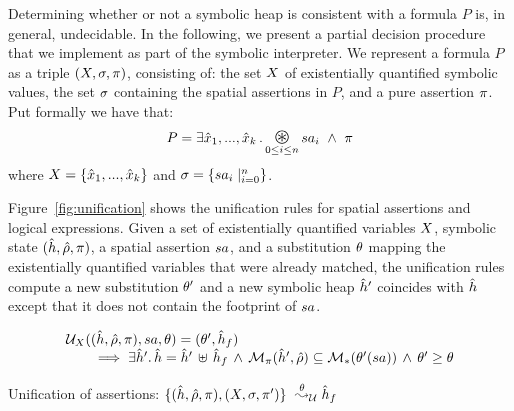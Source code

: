 Determining whether or not a symbolic heap is consistent with a formula $P$ is, in general, 
undecidable. In the following, we present a partial decision procedure that we  
implement as part of the \jsil symbolic interpreter. 
We represent a formula $P$ as a triple 
$(X, \sigma, \pi)$, consisting of: 
 the set $X$ of existentially quantified symbolic values, 
 the set $\sigma$ containing the spatial assertions in $P$, and 
 a pure assertion $\pi$. 
Put formally we have that: 
\begin{equation}
P = \exists \svar_1, ..., \svar_k \, . \bigoast_{0 \leq i \leq n} \sass_i \ \wedge \ \pfs
\end{equation}
where $X = \{ \hat{x}_1, ..., \hat{x}_k \}$ and $\sigma = \{ sa_i \mid_{i = 0}^n \}$. 

Figure~\ref{fig:unification} shows the unification rules for spatial assertions and logical 
expressions. Given a set of existentially quantified variables $X$, 
symbolic state $(\hat{h}, \hat\rho, \pi)$, a spatial assertion $sa$, and a substitution 
$\theta$ mapping the existentially quantified variables that were already matched, 
the unification rules compute a new substitution $\theta'$ and a new symbolic 
heap $\hat{h}'$ coincides with $\hat{h}$ except that it does not contain the footprint 
of $sa$. 

\begin{lemma}
$$
\begin{array}{l}
{\cal U}_{X}((\hat{h}, \hat\rho, \pi), sa, \theta) = (\theta', \hat{h}_f) \\
	\qquad \implies 
		\exists \hat{h}' . \, \hat{h} = \hat{h}' \, \uplus \, \hat{h}_f  \, \wedge \, 
		\mathcal{M}_{\pi}(\hat{h}', \hat\rho) \subseteq \mathcal{M}_{*}(\theta'(sa))  \, \wedge \, 
		\theta' \geq \theta 
\end{array}
$$
\end{lemma}

\begin{display}{Unification of \jsil assertions: $\{ (\hat{h}, \hat\rho, \pi), (X, \sigma, \pi') \} \ \stackrel{\theta}{\leadsto}_{\cal U} \hat{h}_f$}
{\scriptsize
{}}
\end{display}

